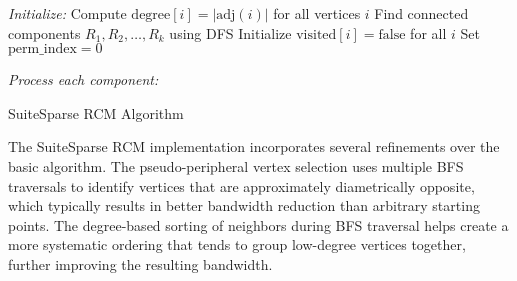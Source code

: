 \begin{algorithm}
    
    \BlankLine
    
    \emph{Initialize:}\;
    Compute $\text{degree}[i] = |\text{adj}(i)|$ for all vertices $i$\;
    Find connected components $R_1, R_2, \ldots, R_k$ using DFS\;
    Initialize $\text{visited}[i] = \text{false}$ for all $i$\;
    Set $\text{perm\_index} = 0$\;
    \BlankLine
    
    \emph{Process each component:}\;
    
    \;
    
    \caption{SuiteSparse RCM Algorithm}
    \label{alg:rcm}
\end{algorithm}

The SuiteSparse RCM implementation incorporates several refinements over the basic algorithm. The pseudo-peripheral vertex selection uses multiple BFS traversals to identify vertices that are approximately diametrically opposite, which typically results in better bandwidth reduction than arbitrary starting points. The degree-based sorting of neighbors during BFS traversal helps create a more systematic ordering that tends to group low-degree vertices together, further improving the resulting bandwidth.


